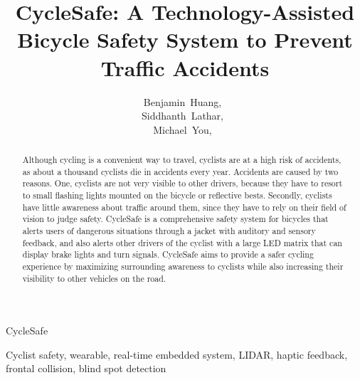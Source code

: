 \documentclass[journal]{IEEEtran}
\begin{document}
\title{CycleSafe: A Technology-Assisted \\ Bicycle Safety System to Prevent Traffic Accidents}

\author{
    Benjamin~Huang,~ \\
    Siddhanth~Lathar,~ \\
    Michael~You,~ \\
}

%
{CycleSafe}

\maketitle

\begin{abstract}
Although cycling is a convenient way to travel, cyclists are at a high risk of accidents, as about a thousand cyclists die in accidents every year. Accidents are caused by two reasons. One, cyclists are not very visible to other drivers, because they have to resort to small flashing lights mounted on the bicycle or reflective bests. Secondly, cyclists have little awareness about traffic around them, since they have to rely on their field of vision to judge safety. CycleSafe is a comprehensive safety system for bicycles that alerts users of dangerous situations through a jacket with auditory and sensory feedback, and also alerts other drivers of the cyclist with a large LED matrix that can display brake lights and turn signals. CycleSafe aims to provide a safer cycling experience by maximizing surrounding awareness to cyclists while also increasing their visibility to other vehicles on the road.
\end{abstract}

\begin{IEEEkeywords}
Cyclist safety, wearable, real-time embedded system, LIDAR, haptic feedback, frontal collision, blind spot detection
\end{IEEEkeywords}
\end{document}

